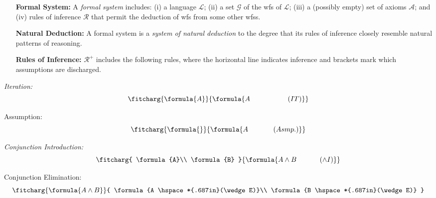 \documentclass[a4paper, 11pt]{article} %
\renewcommand{\L}[0]{\mathcal{L}}
\begin{document}
\begin{enumerate}[leftmargin=1.2in,labelsep=.15in] %
\item[\bf Formal System:] A \textit{formal system} includes: (i) a language $\L$; (ii) a set $\mathcal{G}$ of the wfs of $\L$; (iii) a (possibly empty) set of axioms $\mathcal{A}$; and (iv) rules of inference $\mathcal{R}$ that permit the deduction of wfs from some other wfss.
\item[\bf Natural Deduction:] A formal system is a \textit{system of natural deduction} to the degree that its rules of inference closely resemble natural patterns of reasoning.%
\item[\bf Rules of Inference:] $\mathcal{R}^+$ includes the following rules, where the horizontal line indicates inference and brackets mark which assumptions are discharged.
\end{enumerate}



\begin{multicols}{2}\it
Iteration:
\begin{equation*}
\fitcharg{
\formula{A}
}{
\formula{A \hspace*{.75in}(IT)}
}
\end{equation*}

Assumption:
\begin{equation*}
\fitcharg{
\formula{}
}{
\formula{A \hspace*{.5in}(Asmp.)}
}
\end{equation*}
\end{multicols}
\vspace{-.05in}


\begin{multicols}{2}\it
Conjunction Introduction:\vspace{-.05in}
\begin{equation*}
\fitcharg{
\formula{A}\\
\formula{B}
}{
\formula{A\wedge B \hspace*{.46in}(\wedge I)}
}
\end{equation*}

Conjunction Elimination:\vspace{-.05in}
\begin{equation*}
\fitcharg{
\formula{A\wedge B}
}{
\formula{A \hspace*{.687in}(\wedge E)}\\
\formula{B \hspace*{.687in}(\wedge E)}
}
\end{equation*}
\end{multicols}
\vspace{-.05in}
\end{document}
